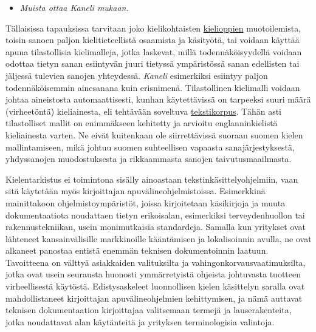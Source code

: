 \documentclass[]{../../metanetpaper}
\begin{document}
\begin{Parallel}[c]{70mm}{70mm}
{\begin{itemize}
\item[] \textit{Muista ottaa Kaneli mukaan.}
\end{itemize}
Tällaisissa tapauksissa tarvitaan joko
kielikohtaisten \underline{kielioppien} muotoilemista, toisin
sanoen paljon kielitieteellistä osaamista ja
käsityötä, tai voidaan käyttää apuna tilastollisia
kielimalleja, jotka laskevat, millä todennäköisyydellä voidaan odottaa
tietyn sanan esiintyvän juuri tietyssä ympäristössä sanan edellisten
tai jäljessä tulevien sanojen yhteydessä. \textit{Kaneli} esimerkiksi
esiintyy paljon todennäköisemmin ainesanana kuin
erisnimenä. Tilastollinen kielimalli voidaan johtaa aineistosta
automaattisesti, kunhan käytettävissä on tarpeeksi suuri määrä
(virheetöntä) kieliainesta, eli tehtävään soveltuva
\underline{tekstikorpus}. Tähän asti tilastolliset mallit on enimmäkseen kehitetty
ja arvioitu englanninkielistä kieliainesta varten. Ne eivät kuitenkaan
ole siirrettävissä suoraan suomen kielen mallintamiseen, mikä johtuu
suomen suhteellisen vapaasta sanajärjestyksestä, yhdyssanojen
muodostuksesta ja rikkaammasta sanojen taivutusmaailmasta.


Kielentarkistus ei toimintona sisälly ainoastaan
tekstinkäsittelyohjelmiin, vaan sitä käytetään myös kirjoittajan
apuvälineohjelmistoissa. Esimerkkinä mainittakoon
ohjelmistoympäristöt, joissa kirjoitetaan käsikirjoja ja muuta
dokumentaatiota noudattaen tietyn erikoisalan, esimerkiksi
terveydenhuollon tai rakennustekniikan, usein monimutkaisia
standardeja. Samalla kun yritykset ovat lähteneet kansainvälisille
markkinoille kääntämisen ja lokalisoinnin avulla, ne ovat alkaneet
panostaa entistä enemmän teknisen dokumentoinnin laatuun.  Tavoitteena
on välttyä asiakkaiden valituksilta ja vahingonkorvausvaatimuksilta,
jotka ovat usein seurausta huonosti ymmärretyistä ohjeista johtuvasta
tuotteen virheellisestä käytöstä. Edistysaskeleet luonnollisen kielen
käsittelyn saralla ovat mahdollistaneet kirjoittajan
apuvälineohjelmien kehittymisen, ja nämä auttavat teknisen
dokumentaation kirjoittajaa valitsemaan termejä ja lauserakenteita,
jotka noudattavat alan käytänteitä ja yrityksen terminologisia
valintoja.

}
\end{Parallel}
\end{document}
